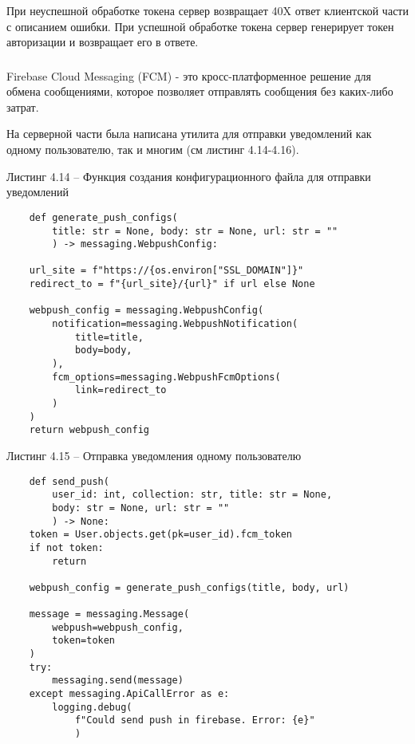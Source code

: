 При неуспешной обработке токена сервер возвращает 40X ответ клиентской части с описанием ошибки.
При успешной обработке токена сервер генерирует токен авторизации и возвращает его в ответе.

\subsubsection{}

Firebase Cloud Messaging (FCM) - это кросс-платформенное решение для обмена сообщениями, которое позволяет  отправлять сообщения без каких-либо затрат.

На серверной части была написана утилита для отправки уведомлений как одному пользователю, так и многим (см листинг 4.14-4.16).


Листинг 4.14 – Функция создания конфигурационного файла для отправки уведомлений
\begin{lstlisting}
    def generate_push_configs(
        title: str = None, body: str = None, url: str = ""
        ) -> messaging.WebpushConfig:

    url_site = f"https://{os.environ["SSL_DOMAIN"]}"
    redirect_to = f"{url_site}/{url}" if url else None

    webpush_config = messaging.WebpushConfig(
        notification=messaging.WebpushNotification(
            title=title,
            body=body,
        ),
        fcm_options=messaging.WebpushFcmOptions(
            link=redirect_to
        )
    )
    return webpush_config
\end{lstlisting}

Листинг 4.15 – Отправка уведомления одному пользователю
\begin{lstlisting}
    def send_push(
        user_id: int, collection: str, title: str = None,
        body: str = None, url: str = ""
        ) -> None:
    token = User.objects.get(pk=user_id).fcm_token
    if not token:
        return

    webpush_config = generate_push_configs(title, body, url)

    message = messaging.Message(
        webpush=webpush_config,
        token=token
    )
    try:
        messaging.send(message)
    except messaging.ApiCallError as e:
        logging.debug(
            f"Could send push in firebase. Error: {e}"
            )
\end{lstlisting}

